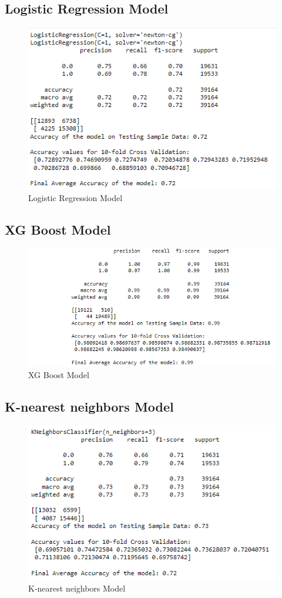 \subsection{Logistic Regression Model}
\vspace{1cm}
\begin{figure}[h]
    \centering
    \includegraphics[width=0.8\linewidth]{image15}
    \caption{Logistic Regression Model}
    \label{fig:Logistic Regression Model}
\end{figure}
\newpage
\subsection{XG Boost Model}
\vspace{1cm}
\begin{figure}[h]
    \centering
    \includegraphics[width=0.8\linewidth]{image16}
    \caption{XG Boost Model}
    \label{fig:XG Boost Model}
\end{figure}
\subsection{K-nearest neighbors Model}
\vspace{1cm}
\begin{figure}[h]
    \centering
    \includegraphics[width=0.8\linewidth]{image17}
    \caption{K-nearest neighbors Model}
    \label{fig:K-nearest neighbors Model}
\end{figure}
\newpage
